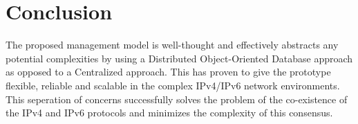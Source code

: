 
%
\section{Conclusion}
The proposed management model is well-thought and effectively abstracts any potential complexities by using a Distributed Object-Oriented Database approach as opposed to a Centralized approach. This has proven to give the prototype flexible, reliable and scalable in the complex IPv4/IPv6 network environments. This seperation of concerns successfully solves the problem of the co-existence of the IPv4 and IPv6 protocols and minimizes the complexity of this consensus.
%